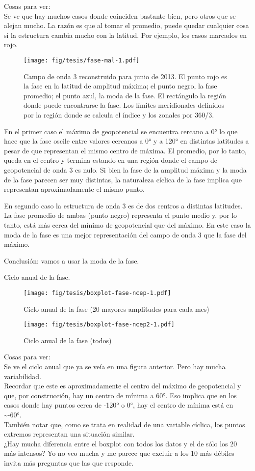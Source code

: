 \documentclass[spanish,a4paper]{book}
\begin{document}
Cosas para ver:\\
Se ve que hay muchos casos donde coinciden bastante bien, pero otros que
se alejan mucho. La razón es que al tomar el promedio, puede quedar
cualquier cosa si la estructura cambia mucho con la latitud. Por
ejemplo, los casos marcados en rojo.

\begin{figure}
\centering
\texttt{[image: fig/tesis/fase-mal-1.pdf]}
\caption{Campo de onda 3 reconstruido para junio de 2013. El punto rojo
es la fase en la latitud de amplitud máxima; el punto negro, la fase
promedio; el punto azul, la moda de la fase. El rectángulo la región
donde puede encontrarse la fase. Los límites meridionales definidos por
la región donde se calcula el índice y los zonales por 360/3.}
\end{figure}

En el primer caso el máximo de geopotencial se encuentra cercano a 0° lo
que hace que la fase oscile entre valores cercanos a 0° y a 120° en
distintas latitudes a pesar de que representan el mismo centro de
máxima. El promedio, por lo tanto, queda en el centro y termina estando
en una región donde el campo de geopotencial de onda 3 es nulo. Si bien
la fase de la amplitud máxima y la moda de la fase parecen ser muy
distintas, la naturaleza cíclica de la fase implica que representan
aproximadamente el mismo punto.

En segundo caso la estructura de onda 3 es de dos centros a distintas
latitudes. La fase promedio de ambas (punto negro) representa el punto
medio y, por lo tanto, está más cerca del mínimo de geopotencial que del
máximo. En este caso la moda de la fase es una mejor representación del
campo de onda 3 que la fase del máximo.

Conclusión: vamos a usar la moda de la fase.

Ciclo anual de la fase.

\begin{figure}
\centering
\texttt{[image: fig/tesis/boxplot-fase-ncep-1.pdf]}
\caption{Ciclo anual de la fase (20 mayores amplitudes para cada mes)}
\end{figure}

\begin{figure}
\centering
\texttt{[image: fig/tesis/boxplot-fase-ncep2-1.pdf]}
\caption{Ciclo anual de la fase (todos)}
\end{figure}

Cosas para ver:\\
Se ve el ciclo anual que ya se veía en una figura anterior. Pero hay
mucha variabilidad.\\
Recordar que este es aproximadamente el centro del máximo de
geopotencial y que, por construcción, hay un centro de mínima a 60°. Eso
implica que en los casos donde hay puntos cerca de -120° o 0°, hay el
centro de mínima está en \textasciitilde{}-60°.\\
También notar que, como se trata en realidad de una variable cíclica,
los puntos extremos representan una situación similar.\\
¿Hay mucha diferencia entre el boxplot con todos los datos y el de sólo
los 20 más intensos? Yo no veo mucha y me parece que excluir a los 10
más débiles invita más preguntas que las que responde.
\end{document}

